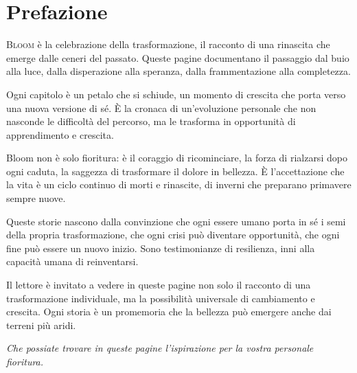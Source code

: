 \chapter{Prefazione}

\lettrine{B}{loom} è la celebrazione della trasformazione, il racconto di una rinascita che emerge dalle ceneri del passato. Queste pagine documentano il passaggio dal buio alla luce, dalla disperazione alla speranza, dalla frammentazione alla completezza.

Ogni capitolo è un petalo che si schiude, un momento di crescita che porta verso una nuova versione di sé. È la cronaca di un'evoluzione personale che non nasconde le difficoltà del percorso, ma le trasforma in opportunità di apprendimento e crescita.

Bloom non è solo fioritura: è il coraggio di ricominciare, la forza di rialzarsi dopo ogni caduta, la saggezza di trasformare il dolore in bellezza. È l'accettazione che la vita è un ciclo continuo di morti e rinascite, di inverni che preparano primavere sempre nuove.

Queste storie nascono dalla convinzione che ogni essere umano porta in sé i semi della propria trasformazione, che ogni crisi può diventare opportunità, che ogni fine può essere un nuovo inizio. Sono testimonianze di resilienza, inni alla capacità umana di reinventarsi.

Il lettore è invitato a vedere in queste pagine non solo il racconto di una trasformazione individuale, ma la possibilità universale di cambiamento e crescita. Ogni storia è un promemoria che la bellezza può emergere anche dai terreni più aridi.

\vspace{1em}
\textit{Che possiate trovare in queste pagine l'ispirazione per la vostra personale fioritura.}

\cleardoublepage   %
